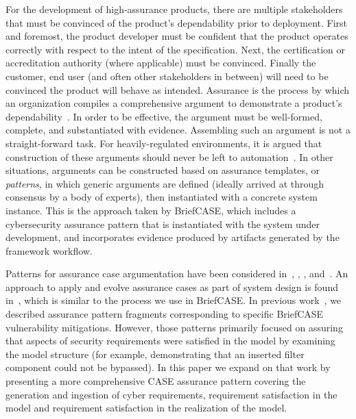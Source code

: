 For the development of high-assurance products, there are multiple stakeholders that must be convinced of the product's dependability prior to deployment.  First and foremost, the product developer must be confident that the product operates correctly with respect to the intent of the specification.  Next, the certification or accreditation authority (where applicable) must be convinced.  Finally the customer, end user (and often other stakeholders in between) will need to be convinced the product will behave as intended.  Assurance is the process by which an organization compiles a comprehensive argument to demonstrate a product's dependability~\cite{???}.  In order to be effective, the argument must be well-formed, complete, and substantiated with evidence.  
%
Assembling such an argument is not a straight-forward task.  For heavily-regulated environments, it is argued that construction of these arguments should never be left to automation~\cite{???-Holloway}.  In other situations, arguments can be constructed based on assurance templates, or \textit{patterns}, in which generic arguments are defined (ideally arrived at through consensus by a body of experts), then instantiated with a concrete system instance.  This is the approach taken by BriefCASE, which includes a cybersecurity assurance pattern that is instantiated with the system under development, and incorporates evidence produced by artifacts generated by the framework workflow.

Patterns for assurance case argumentation have been considered in~\cite{Denney13:pattern}, \cite{Hawkins11:pattern}, \cite{Kelly97:patterns}, and~\cite{Sun11:pattern}. An approach to apply and evolve assurance cases as part of system design is found in~\cite{Graydon07:dev}, which is similar to the process we use in BriefCASE.
%
In previous work~\cite{resolute-destion}, we described assurance pattern fragments corresponding to specific BriefCASE vulnerability mitigations.  However, those patterns primarily focused on assuring that aspects of security requirements were satisfied in the model by examining the model structure (for example, demonstrating that an inserted filter component could not be bypassed).  
%
In this paper we expand on that work by presenting a more comprehensive CASE assurance pattern covering the generation and ingestion of cyber requirements, requirement satisfaction in the model and requirement satisfaction in the realization of the model.  


